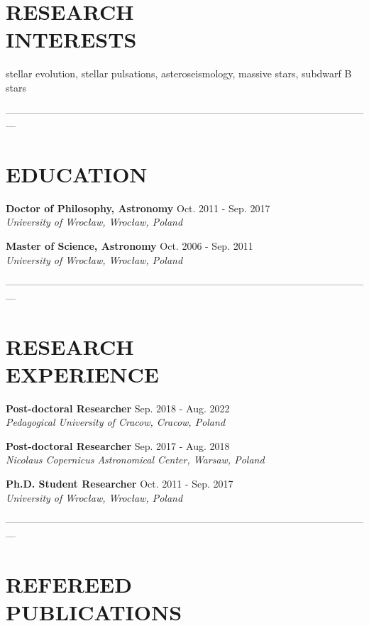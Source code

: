 \documentclass[margin, 10pt]{res} %
\begin{document}
\begin{resume}

\section{RESEARCH \\ INTERESTS}  

stellar evolution, stellar pulsations, asteroseismology, massive stars, subdwarf B stars

---------------------------------------------------------------------------------------------------------------

\section{EDUCATION}

{\bf Doctor of Philosophy, Astronomy}  \hfill Oct. 2011 - Sep. 2017 \\
{\sl University of Wroc\l{}aw, Wroc\l{}aw, Poland}

{\bf Master of Science, Astronomy}  \hfill Oct. 2006 - Sep. 2011 \\
{\sl University of Wroc\l{}aw, Wroc\l{}aw, Poland}

---------------------------------------------------------------------------------------------------------------

\section{RESEARCH \\ EXPERIENCE}  

{\bf Post-doctoral Researcher}  \hfill Sep. 2018 - Aug. 2022 \\
{\sl Pedagogical University of Cracow, Cracow, Poland}

{\bf Post-doctoral Researcher}  \hfill Sep. 2017 - Aug. 2018 \\
{\sl Nicolaus Copernicus Astronomical Center, Warsaw, Poland}

{\bf Ph.D. Student Researcher}  \hfill Oct. 2011 - Sep. 2017 \\
{\sl University of Wroc\l{}aw, Wroc\l{}aw, Poland}

---------------------------------------------------------------------------------------------------------------

\section{REFEREED \\ PUBLICATIONS} 


\end{resume}
\end{document}
